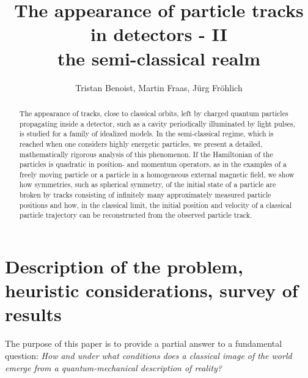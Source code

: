 \documentclass[11pt]{article}
\author{Tristan Benoist, Martin Fraas, J\"urg Fr\"ohlich}
\title{The appearance of particle tracks in detectors - II\\
the semi-classical realm}
\begin{document}
\maketitle

\vspace{1em}

\begin{abstract}
The appearance of tracks, close to classical orbits, left by charged quantum particles propagating 
inside a detector, such as a cavity periodically illuminated by light pulses, is studied for a family of idealized models. 
In the semi-classical regime, which is reached when one considers highly energetic particles, we present a
detailed, mathematically rigorous analysis of this phenomenon. 
If the Hamiltonian of the particles is quadratic in position- and momentum operators, as in the examples 
of a freely moving particle or a particle in a homogeneous external magnetic field, we show how symmetries, 
such as spherical symmetry, of the initial state of a particle are broken by tracks consisting of infinitely 
many approximately measured particle positions and how, in the classical limit, the initial position and 
velocity of a classical particle trajectory can be reconstructed from the observed particle track.
\end{abstract}

\section{Description of the problem, heuristic considerations, survey of results}\label{Intro}


The purpose of this paper is to provide a partial answer to a fundamental question: \textit{How and under 
what conditions does a classical image of the world emerge from a quantum-mechanical description of reality?} 
\end{document}
